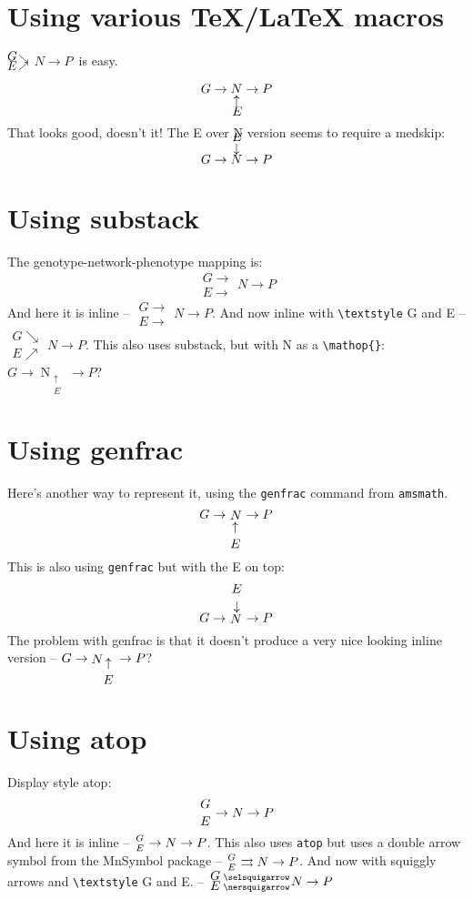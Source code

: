 \documentclass[11pt]{article}
\newcommand{\GoverE}{\ensuremath{\ooalign{\raisebox{0.9ex}{$G$}\cr\hidewidth\raisebox{-0.9ex}{$E$}}}}
\newcommand{\OUarrow}{\ensuremath{
\ooalign{%
\raisebox{0.75ex}{${\scriptstyle\searrow}$}\cr\raisebox{-0.65ex}{${\scriptstyle\nearrow}$}%
}%
}%
}
\newcommand{\GENP}{\GoverE\OUarrow\ensuremath{N\!\to\!P}}
\newcommand{\NOE}{\ensuremath{\ooalign{\hfil$N$\hfil\cr\hfil\raisebox{-2ex}{$\uparrow$}\hfil\cr\hfil\raisebox{-4.1ex}{$E$}\cr}}}
\newcommand{\EON}{\ensuremath{\ooalign{\hfil$N$\hfil\cr\hfil\raisebox{2ex}{$\downarrow$}\hfil\cr\hfil\raisebox{4.1ex}{$E$}\cr}}}
\begin{document}
\section*{Using various TeX/LaTeX macros}

\GENP\ is easy.

\[
{G}\to\NOE\to{P}
\]
That looks good, doesn't it! The E over N version seems to require a medskip:
\medskip

\[
{G}\to\EON\to{P}
\]


\section*{Using substack}

The genotype-network-phenotype mapping is:    
\[
\substack{G\rightarrow\\E\rightarrow}N \rightarrow P
\]    
And here it is inline -- $\substack{G\rightarrow\\E\rightarrow}N \rightarrow P$. And now inline with \verb|\textstyle| G and E -- $\substack{{\textstyle G}\searrow\\ {\textstyle E}\nearrow}N \to P$.
This also uses substack, but with N as a \verb|\mathop{}|: $G \rightarrow \mathop{N}_{\substack{\uparrow\\E}} \rightarrow P$? 

    
\section*{Using genfrac}    
Here's another way to represent it, using the \verb|genfrac| command from \verb|amsmath|.
\[
G \rightarrow \mathop{N}_{\genfrac{}{}{0pt}{0}{\uparrow}{E}} \rightarrow P
\]
This is also using \verb|genfrac| but with the E on top:
\[
G \rightarrow \mathop{N}^{\genfrac{}{}{0pt}{0}{E}{\downarrow}} \rightarrow P
\]
The problem with genfrac is that it doesn't produce a very nice looking inline version -- \(G \rightarrow \mathop{N}_{\genfrac{}{}{0pt}{0}{\uparrow}{E}} \rightarrow P\)?

\section*{Using atop}

Display style atop:
\[
{G \atop E} \to N \to P
\]
And here it is inline -- \( {G \atop E} \to N \to P \). This also uses \verb|atop| but uses a double arrow symbol from the MnSymbol package -- \( {G \atop E} \rightrightarrows N \to P \). And now with squiggly arrows and \verb|\textstyle| G and E.  -- \( {{\textstyle G} \atop {\textstyle E}} {\selsquigarrow \atop \nersquigarrow} N \to P \)
\end{document}

